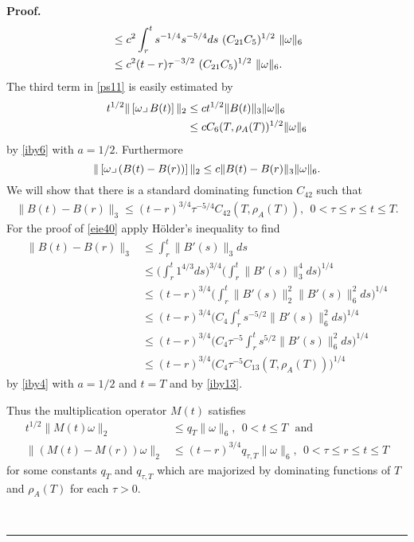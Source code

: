 \documentclass[12pt]{article}
\newenvironment{proof}[1][Proof]{\textbf{#1.} }{\ \rule{0.5em}{0.5em}}
\def \({\Big(}
\def \){\Big)}
\def \w{\omega}
\def \beq{\begin{equation}}
\def \eeq{\end{equation}}
\def \eref{\eqref}
\def \lrc{\lrcorner\,}
\numberwithin{equation}{section}
\begin{document}
\begin{proof}
\begin{align*}
  &\le c^2 \int_r^t s^{-1/4} s^{-5/4} ds \ (C_{21} C_5)^{1/2}\ \|\w\|_6 \notag\\
  &\le c^2 (t-r) \tau^{-3/2}   \ (C_{21} C_5)^{1/2}  \ \|\w\|_6.
 \end{align*}
   The third term in \eref{ps11} is easily estimated by
  \begin{align*}
  t^{1/2} \|\, [\w \lrc B(t)]\, \|_2 &\le c t^{1/2} \|B(t)\|_3 \|\w\|_6 \notag \\
  &\le  c  C_6(T, \rho_A(T))^{1/2}  \|\w\|_6  
  \end{align*}
  by \eref{iby6} with $a = 1/2$. Furthermore  
  \beq
  \|\, [\w \lrc (B(t)- B(r))]\, \|_2\le c\|B(t) - B(r)\|_3 \|\w\|_6. \notag
  \eeq
  We will show that there is a standard dominating function $C_{42}$ such that
  \begin{align}
  \|B(t) - B(r)\|_3 \le (t-r)^{3/4} \tau^{-5/4} C_{42}(T, \rho_A(T)),\ \ 0 <\tau \le r \le t \le T. \label{eie40}
  \end{align} 
  For the proof of \eref{eie40} apply H\"older's inequality to find
  \begin{align*}
  \|B(t) - B(r)\|_3 &\le \int_r^t \|B'(s)\|_3 ds \\
  &\le \Big( \int_r^t 1^{4/3} ds \Big)^{3/4} \(\int_r^t \|B'(s)\|_3^4ds \)^{1/4} \\
  & \le (t-r)^{3/4}   \(\int_r^t \|B'(s)\|_2^2 \|B'(s)\|_6^2 ds \)^{1/4} \\
  &\le (t-r)^{3/4}   \(C_{4} \int_r^t s^{-5/2}\|B'(s)\|_6^2 ds \)^{1/4} \\
  &\le (t-r)^{3/4}   \(C_{4}  \tau^{-5} \int_r^t s^{5/2}\|B'(s)\|_6^2 ds \)^{1/4} \\
  &\le (t-r)^{3/4}   \(C_{4}  \tau^{-5} C_{13}(T, \rho_A(T)) \)^{1/4}
  \end{align*}
  by  \eref{iby4} with $a = 1/2$ and $t =T$ and by \eref{iby13}.
  
 
  Thus the multiplication operator $M(t)$  satisfies
 \begin{align*}
 t^{1/2}\|M(t)\w\|_2   &\le q_T \|\w\|_6, \ \ 0<t \le T\ \ \ \text{and}\\
 \| (M(t) - M(r))\w \|_2 &\le (t-r)^{3/4} q_{\tau, T} \|\w\|_6,\ \ 0 < \tau \le r \le t \le T
 \end{align*}
 for some constants $q_T$ and $q_{\tau, T}$ which are 
 majorized by dominating functions of $T$ and $\rho_A(T)$ for each $\tau >0$.
  
  
  

\end{proof}
\end{document}
